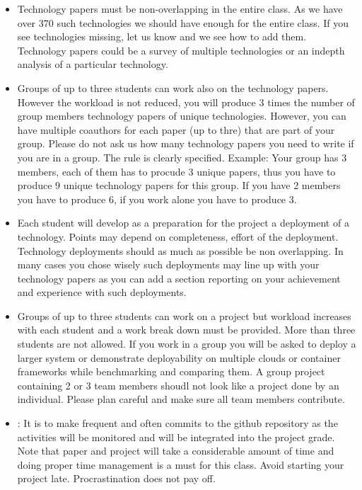 \begin{itemize}
\item {} 
 Technology papers must be non-overlapping in
the entire class. As we have over 370 such technologies we should
have enough for the entire class. If you see technologies missing,
let us know and we see how to add them. Technology papers could be a
survey of multiple technologies or an indepth analysis of a
particular technology.

\item {} 
 Groups of up to three students can work
also on the technology papers. However the workload is not reduced,
you will produce 3 times the number of group members technology
papers of unique technologies. However, you can have multiple
coauthors for each paper (up to thre) that are part of your
group. Please do not ask us how many technology papers you need to
write if you are in a group. The rule is clearly specified. Example:
Your group has 3 members, each of them has to procude 3 unique
papers, thus you have to produce 9 unique technology papers for this
group. If you have 2 members you have to produce 6, if you work
alone you have to produce 3.

\item {} 
 Each student will
develop as a preparation for the project a deployment of a
technology. Points may depend on completeness, effort of the
deployment. Technology deployments should as much as possible be non
overlapping. In many cases you chose wisely such deployments may
line up with your technology papers as you can add a section
reporting on your achievement and experience with such
deployments.

\item {} 
 Groups of up to three students can work on a
project but workload increases with each student and a work break
down must be provided.  More than three students are not allowed. If
you work in a group you will be asked to deploy a larger system or
demonstrate deployability on multiple clouds or container frameworks
while benchmarking and comparing them. A group project containing 2
or 3 team members shoudl not look like a project done by an
individual. Please plan careful and make sure all team members
contribute.

\item {} 
: It is  to make frequent and
often commits to the github repository as the activities will be
monitored and will be integrated into the project grade.  Note that
paper and project will take a considerable amount of time and doing
proper time management is a must for this class. Avoid starting your
project late. Procrastination does not pay off.


\end{itemize}
